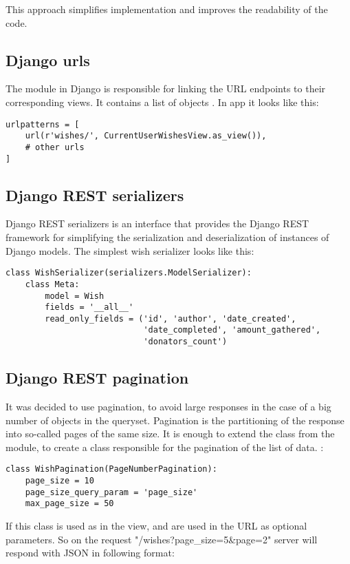 This approach simplifies implementation and improves the readability of the code.


\subsection{Django urls}
The  module in Django is responsible for linking the \ac{URL} endpoints to their corresponding views. It contains a list of objects . In  app it looks like this:

\begin{lstlisting}
urlpatterns = [
    url(r'wishes/', CurrentUserWishesView.as_view()),
    # other urls
]
\end{lstlisting}


\subsection{Django REST serializers}
Django REST serializers is an interface that provides the Django REST framework for simplifying the serialization and deserialization of instances of Django models. The simplest wish serializer looks like this:
\begin{lstlisting}
class WishSerializer(serializers.ModelSerializer):
    class Meta:
        model = Wish
        fields = '__all__'
        read_only_fields = ('id', 'author', 'date_created',
                            'date_completed', 'amount_gathered',
                            'donators_count')
\end{lstlisting}


\subsection{Django REST pagination}
It was decided to use pagination, to avoid large responses in the case of a big number of objects in the queryset. Pagination is the partitioning of the response into so-called pages of the same size. It is enough to extend the  class from the module, to create a class responsible for the pagination of the list of data.
:

\begin{lstlisting}
class WishPagination(PageNumberPagination):
    page_size = 10
    page_size_query_param = 'page_size'
    max_page_size = 50
\end{lstlisting}

If this class is used as  in the view,  and  are used in the \ac{URL} as optional parameters. So on the request "/wishes?page\_size=5\&page=2" server will respond with \ac{JSON} in following format:

